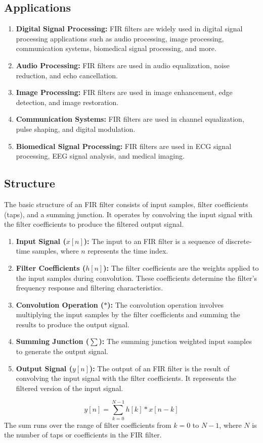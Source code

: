 \documentclass{zc-ust-hw}
\begin{document}
\subsection{Applications}
\begin{enumerate}
  \item \textbf{Digital Signal Processing:} FIR filters are widely used
    in digital signal processing applications such as audio processing,
    image processing, communication systems, biomedical signal
    processing, and more.
  \item \textbf{Audio Processing:} FIR filters are used in audio
    equalization, noise reduction, and echo cancellation. \cite{pawar2014design}
  \item \textbf{Image Processing:} FIR filters are used in image
    enhancement, edge detection, and image restoration. \cite{lab6_manual}
  \item \textbf{Communication Systems:} FIR filters are used in
    channel equalization, pulse shaping, and digital modulation. \cite{hossain2021review}
  \item \textbf{Biomedical Signal Processing:} FIR filters are used in
    ECG signal processing, EEG signal analysis, and medical imaging. \cite{marchon2019efficient}
\end{enumerate}
\subsection{Structure}
The basic structure of an FIR filter consists
of input samples, filter coefficients (taps), and a summing junction.
It operates by convolving the input signal with the filter coefficients
to produce the filtered output signal.
\begin{enumerate}
  \item \textbf{Input Signal ($x[n]$):} The input to an FIR filter is a
    sequence of discrete-time samples, where \(n\) represents the time
    index.
  \item \textbf{Filter Coefficients ($h[n]$):} The filter coefficients
    are the weights applied to the input samples during convolution.
    These coefficients determine the filter's frequency response and
    filtering characteristics.
  \item \textbf{Convolution Operation (\(*\)):} The convolution operation
    involves multiplying the input samples by the filter coefficients
    and summing the results to produce the output signal.
  \item \textbf{Summing Junction (\(\sum\)):} The summing junction
    weighted input samples to generate the output signal.
  \item \textbf{Output Signal ($y[n]$):} The output of an FIR filter is
    the result of convolving the input signal with the filter
    coefficients. It represents the filtered version of the input
    signal.
\end{enumerate}
\begin{equation}
  y[n] = \sum_{k=0}^{N-1} h[k] * x[n-k]
\end{equation}
The sum runs over the range of filter coefficients from $k=0$ to
$N-1$, where $N$ is the number of taps or coefficients in the FIR
filter.
\end{document}
